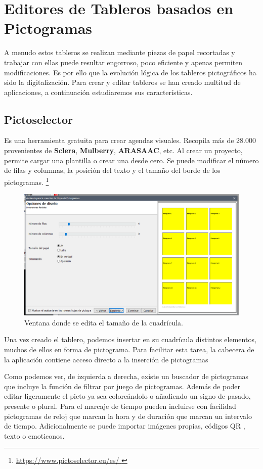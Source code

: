 \section{Editores de Tableros basados en Pictogramas}

A menudo estos tableros se realizan mediante piezas de papel recortadas y trabajar con ellas puede resultar engorroso, poco eficiente y apenas permiten modificaciones. Es por ello que la evolución lógica de los tableros pictográficos ha sido la digitalización. Para crear y editar tableros se han creado multitud de aplicaciones, a continuación estudiaremos sus características.

\subsection{Pictoselector}
Es una herramienta gratuita para crear agendas visuales. Recopila más de 28.000 provenientes de \textbf{Sclera}, \textbf{Mulberry}, \textbf{ARASAAC}, etc. Al crear un proyecto, permite cargar una plantilla o crear una desde cero. Se puede modificar el número de filas y columnas, la posición del texto y el tamaño del borde de los pictogramas.
\footnote{\url{ https://www.pictoselector.eu/es/ }}

\begin{figure}[h!]
	\centering
	\includegraphics[width=0.7\linewidth]{Imagenes/Bitmap/Pictoselector Tablero}
	\caption{Ventana donde se edita el tamaño de la cuadrícula.}
	\label{fig:pictoselector-tablero}
\end{figure}


Una vez creado el tablero, podemos insertar en su cuadrícula distintos elementos, muchos de ellos en forma de pictograma. Para facilitar esta tarea, la cabecera de la aplicación contiene acceso directo a la inserción de pictogramas



Como podemos ver, de izquierda a derecha, existe un buscador de pictogramas que incluye la función de filtrar por juego de pictogramas. Además de poder editar ligeramente el picto ya sea coloreándolo o añadiendo un signo de pasado, presente o plural. Para el marcaje de tiempo pueden incluirse con facilidad pictogramas de reloj que marcan la hora y de duración que marcan un intervalo de tiempo. Adicionalmente se puede importar imágenes propias, códigos QR , texto o emoticonos.

